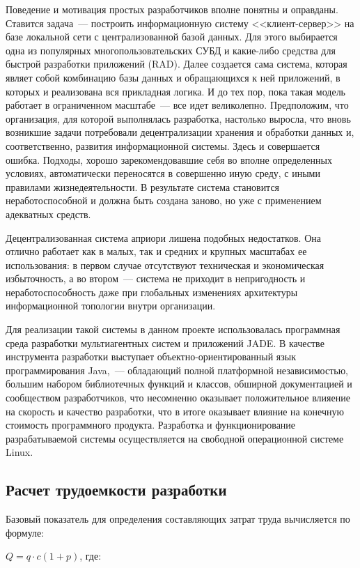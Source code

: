 Поведение и мотивация простых разработчиков вполне понятны и оправданы. Ставится задача~--- построить информационную систему <<клиент-сервер>> на базе локальной сети с централизованной базой данных. Для этого выбирается одна из популярных многопользовательских СУБД и какие-либо средства для быстрой разработки приложений (RAD). Далее создается сама система, которая являет собой комбинацию базы данных и обращающихся к ней приложений, в которых и реализована вся прикладная логика. И до тех пор, пока такая модель работает в ограниченном масштабе~--- все идет великолепно. Предположим, что организация, для которой выполнялась разработка, настолько выросла, что вновь возникшие задачи потребовали децентрализации хранения и обработки данных и, соответственно, развития информационной системы. Здесь и совершается ошибка. Подходы, хорошо зарекомендовавшие себя во вполне определенных условиях, автоматически переносятся в совершенно иную среду, с иными правилами жизнедеятельности. В результате система становится неработоспособной и должна быть создана заново, но уже с применением адекватных средств.

Децентрализованная система априори лишена подобных недостатков. Она отлично работает как в малых, так и средних и крупных масштабах ее использования: в первом случае отсутствуют техническая и экономическая избыточность, а во втором~--- система не приходит в непригодность и неработоспособность даже при глобальных изменениях архитектуры информационной топологии внутри организации.

Для реализации такой системы в данном проекте использовалась программная среда разработки мультиагентных систем и приложений JADE. В качестве инструмента разработки выступает объектно-ориентированный язык  программирования Java,~--- обладающий полной платформной независимостью, большим набором библиотечных функций и классов, обширной документацией и сообществом разработчиков, что несомненно оказывает положительное влияение на скорость и качество разработки, что в итоге оказывает влияние на конечную стоимость программного продукта. Разработка и функционирование разрабатываемой системы осуществляется на свободной операционной системе Linux.

\subsection{Расчет трудоемкости разработки}
Базовый показатель для определения составляющих затрат труда вычисляется по формуле:

\begin{center}
$ Q = q \cdot c (1 + p) $, где:
\end{center}

